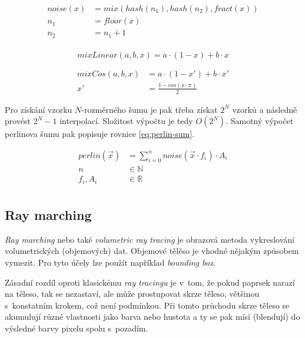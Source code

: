 \documentclass[a4paper, 12pt]{article}
\begin{document}
\begin{equation}
  \begin{aligned}
    noise(x) & = mix(hash(n_1), hash(n_2), fract(x)) \\
    n_1 & = floor(x) \\
    n_2 & = n_1 + 1 \\
  \end{aligned}
  \label{eq:floating-noise}
\end{equation}

\begin{equation}
    mixLinear(a, b, x) = a \cdot (1 - x) + b \cdot x
  \label{eq:mix-lin}
\end{equation}

\begin{equation}
  \begin{aligned}
    mixCos(a, b, x) & = a \cdot (1 - x') + b \cdot x' \\
    x' & = \frac{1 - cos(x \cdot \pi)}{2}
  \end{aligned}
  \label{eq:mix-cos}
\end{equation}

Pro získání vzorku $N$-rozměrného šumu je pak třeba získat $2^N$ vzorků
a následně provést $2^N-1$ interpolací. Složitost výpočtu je tedy $O(2^N)$.
Samotný výpočet perlinova šumu pak popisuje
rovnice \ref{eq:perlin-sum}.

\begin{equation}
  \begin{aligned}
    perlin(\vec{x}) & = \sum^{n}_{i=0} noise(\vec{x} \cdot f_i) \cdot A_i \\
    n & \in \mathbb{N} \\
    f_i, A_i & \in \mathbb{R} \\
  \end{aligned}
  \label{eq:perlin-sum}
\end{equation}

\subsection{Ray marching}

\textit{Ray marching} nebo také \textit{volumetric ray tracing} je obrazová
metoda vykreslování volumetrických (objemových) dat.
Objemové tělěso je vhodné nějakým způsobem vymezit. Pro tyto účely
lze použít například \textit{bounding box}.

Zásadní rozdíl oproti klasickému \textit{ray tracingu} je v~tom, že pokud
paprsek narazí na těleso, tak se nezastaví, ale může prostupovat skrze těleso,
většinou s~konstatním krokem, což není podmínkou.
Při tomto průchodu skrze těleso se akumulují různé vlastnosti
jako barva nebo hustota a ty se pak mísí (blendují) do výsledné barvy pixelu
spolu s~pozadím.
\end{document}
